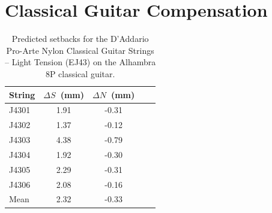 %
%
%

 \section{Classical Guitar Compensation\label{sct:comp}}




\begin{table}%
  \centering
  \caption{\label{tbl:ej43_setbacks} Predicted setbacks for the D'Addario Pro-Arte Nylon Classical Guitar Strings -- Light Tension (EJ43) on the Alhambra 8P classical guitar.}
    \begin{tabular}{lcccc}
    \hline \hline
    String  & $\Delta S$~(mm) & $\Delta N$~(mm) \\
    \hline
    J4301 & 1.91 & -0.31 \\
    J4302 & 1.37 & -0.12 \\
    J4303 & 4.38 & -0.79 \\
    J4304 & 1.92 & -0.30 \\
    J4305 & 2.29 & -0.31 \\
    J4306 & 2.08 & -0.16 \\
    \hline \hline
    Mean & 2.32 & -0.33 \\
    \hline
    \end{tabular}%
  \label{tab:addlabel}%
\end{table}%


